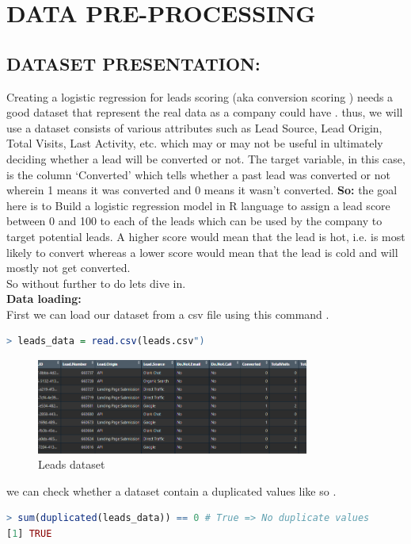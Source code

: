 \chapter{DATA PRE-PROCESSING}


\section{DATASET PRESENTATION:}
Creating a logistic regression for leads scoring (aka  conversion scoring ) needs a good dataset that represent the real data as a company could have . thus, we will use a dataset consists of various attributes such as Lead Source, Lead Origin, Total Visits, Last Activity, etc. which may or may not be useful in ultimately deciding whether a lead will be converted or not. The target variable, in this case, is the column ‘Converted’ which tells whether a past lead was converted or not wherein 1 means it was converted and 0 means it wasn’t converted.
\textbf{So: } the goal here is to Build a logistic regression model in R language to assign a lead score between 0 and 100 to each of the leads which can be used by the company to target potential leads. A higher score would mean that the lead is hot, i.e. is most likely to convert whereas a lower score would mean that the lead is cold and will mostly not get converted.\\
So without further to do lets dive in.\\
\textbf{\large Data loading: }\\
First we can load our dataset from a csv file using this command .
\begin{lstlisting}[language=R]
> leads_data = read.csv(leads.csv")
\end{lstlisting}
\begin{figure}[ht]
    \centering
    \includegraphics[width=0.8\textwidth]{assets/leadsData.png}
    \caption{ Leads dataset}
\end{figure}
we can check whether a dataset contain a duplicated values like so .
\begin{lstlisting}[language=R]
> sum(duplicated(leads_data)) == 0 # True => No duplicate values
[1] TRUE
\end{lstlisting}
